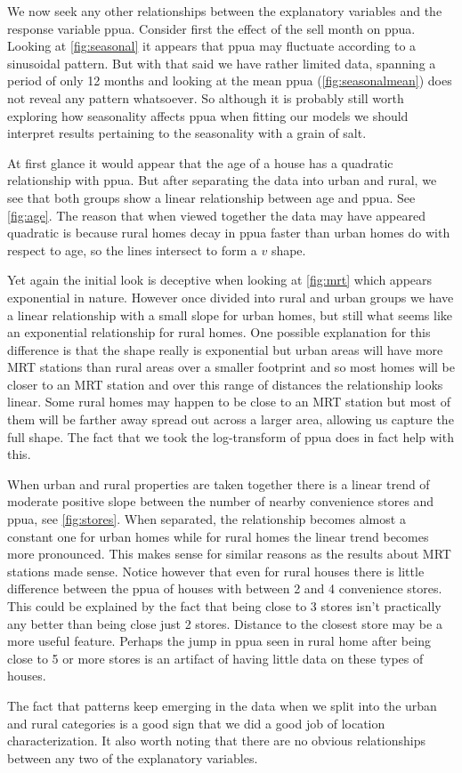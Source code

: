 We now seek any other relationships between the explanatory variables and the response variable ppua. Consider first the effect of
the sell month on ppua. Looking at \cref{fig:seasonal} it appears that ppua may fluctuate according to a sinusoidal pattern. But
with that said we have rather limited data, spanning a period of only 12 months and looking at the mean ppua
(\cref{fig:seasonalmean}) does not reveal any pattern whatsoever. So although it is probably still worth exploring how seasonality
affects ppua when fitting our models we should interpret results pertaining to the seasonality with a grain of salt.

At first glance it would appear that the age of a house has a quadratic relationship with ppua. But after separating the data into
urban and rural, we see that both groups show a linear relationship between age and ppua. See \cref{fig:age}. The reason that when
viewed together the data may have appeared quadratic is because rural homes decay in ppua faster than urban homes do with respect
to age, so the lines intersect to form a $v$ shape.

Yet again the initial look is deceptive when looking at \cref{fig:mrt} which appears exponential in nature. However once divided
into rural and urban groups we have a linear relationship with a small slope for urban homes, but still what seems like an
exponential relationship for rural homes. One possible explanation for this difference is that the shape really is exponential but
urban areas will have more MRT stations than rural areas over a smaller footprint and so most homes will be closer to an MRT
station and over this range of distances the relationship looks linear. Some rural homes may happen to be close to an MRT station
but most of them will be farther away spread out across a larger area, allowing us capture the full shape. The fact that we took
the log-transform of ppua does in fact help with this.

When urban and rural properties are taken together there is a linear trend of moderate positive slope between the number of nearby
convenience stores and ppua, see \cref{fig:stores}. When separated, the relationship becomes almost a constant one for urban homes
while for rural homes the linear trend becomes more pronounced. This makes sense for similar reasons as the results about MRT
stations made sense. Notice however that even for rural houses there is little difference between the ppua of houses with between
2 and 4 convenience stores. This could be explained by the fact that being close to 3 stores isn't practically any better than
being close just 2 stores. Distance to the closest store may be a more useful feature. Perhaps the jump in ppua seen in
rural home after being close to 5 or more stores is an artifact of having little data on these types of houses.

The fact that patterns keep emerging in the data when we split into the urban and rural categories is a good sign that we did a
good job of location characterization. It also worth noting that there are no obvious relationships between any two of the
explanatory variables.
